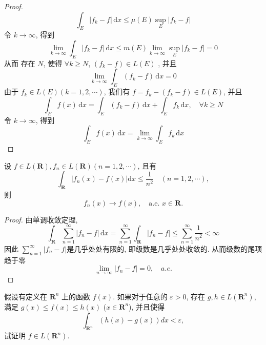\documentclass[../main.tex]{subfiles}
\begin{document}
\begin{proof}
    \[
    \int_{E}\left| f_{k}-f \right| \,\mathrm{d} x\le \mu \left( E \right)\sup _{E}\left| f_{k}-f \right|   
    \]令 \(  k\to \infty  \), 得到 \[
    \lim_{k\to \infty}\int_{E}\left| f_{k}-f \right| \,\mathrm{d} x\le  m \left( E \right)   \lim_{k\to \infty}\sup _{E}\left| f_{k}-f \right| = 0
    \] 从而 存在 \(  N  \), 使得 \(  \forall k\ge N  \), \( \left(  f_{k}-f \right) \in L\left( E \right)   \)  , 并且 \[
   \lim_{k\to \infty} \int_{E}\left( f_{k}-f \right)\,\mathrm{d} x=  0
    \]由于 \(  f_{k}\in L\left( E \right)\left( k= 1,2,\cdots  \right)    \), 我们有 \(  f= f_{k}-\left( f_{k}-f \right) \in L\left( E \right)    \), 并且 \[
    \int_{E}f\left( x \right)\,\mathrm{d} x=  \int_{E}\left( f_{k}-f \right)\,\mathrm{d} x+ \int_{E}f_{k}\,\mathrm{d} x  ,\quad \forall k\ge N
    \] 令 \(  k\to \infty  \), 得到 \[
    \int_{E}f\left( x \right)\,\mathrm{d} x=  \lim_{k\to \infty}\int_{E}f_{k}\,\mathrm{d} x 
    \] 
\end{proof}
\begin{exercise}{}{}
设 $f \in L(\mathbf{R}), f_n \in L(\mathbf{R}) (n=1,2,\cdots)$, 且有
\[
\int_{\mathbf{R}} |f_n(x) - f(x)| \mathrm{d}x \le \frac{1}{n^2} \quad (n=1,2,\cdots),
\]
则
\[
f_n(x) \to f(x), \quad \text{a.e. } x \in \mathbf{R}.
\]
\end{exercise}
\begin{proof}
     由单调收敛定理,  \[
    \int_{\mathbf{R}}\sum _{n = 1}^{\infty}\left| f_{n}-f \right|\,\mathrm{d} x= \sum _{n = 1}^{\infty}\int_{\mathbf{R}}\left| f_{n}-f \right|\le \sum _{n = 1}^{\infty}\frac{1 }{n^{2} }   < \infty
    \]因此 \(  \sum _{n = 1}^{\infty}\left| f_{n} -f\right|   \)是几乎处处有限的, 即级数是几乎处处收敛的. 从而级数的尾项趋于零 \[
    \lim_{n\to \infty}\left| f_{n}-f \right|= 0,\quad a.e. 
    \] 
\end{proof}

\begin{exercise}{}{}
假设有定义在 $\mathbf{R}^n$ 上的函数 $f(x)$. 如果对于任意的 $\varepsilon > 0$, 存在 $g, h \in L(\mathbf{R}^n)$, 满足 $g(x) \le f(x) \le h(x)$ ($x \in \mathbf{R}^n$), 并且使得
\[
\int_{\mathbf{R}^n} (h(x) - g(x)) dx < \varepsilon,
\]
试证明 $f \in L(\mathbf{R}^n)$.
\end{exercise}
\end{document}

